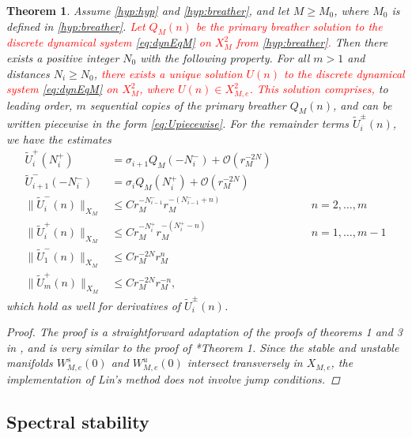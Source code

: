 \documentclass[12pt,reqno]{amsart}
\newtheorem{theorem}{Theorem}
\theoremstyle{definition}
\newcommand{\revised}[1]{ \textcolor{red}{#1} }
\begin{document}
\begin{theorem}\label{th:multi-breathers}
Assume \cref{hyp:hyp} and \cref{hyp:breather}, and let $M \geq M_0$, where $M_0$ is defined in \cref{hyp:breather}. 
\revised{
Let $Q_M(n)$ be the primary breather solution to the discrete dynamical system \cref{eq:dynEqM} on $X_M^2$ from \cref{hyp:breather}.
}
Then there exists a positive integer $N_0$ with the following property. For all $m > 1$ and distances $N_i \geq N_0$, 
\revised{
there exists a unique solution $U(n)$ to the discrete dynamical system \cref{eq:dynEqM} on $X_M^2$, where $U(n) \in X_{M,e}^2$. This solution comprises, 
}
to leading order, $m$ sequential copies of the primary breather $Q_M(n)$, and can be written piecewise in the form \cref{eq:Upiecewise}. For the remainder terms $\tilde{U}_i^\pm(n)$, we have the estimates
\begin{equation}\label{eq:Uestimates}
\begin{aligned}
\tilde{U}_i^+(N_i^+) &= \sigma_{i+1} Q_M(-N_i^-) + \mathcal{O}(r_M^{-2N}) \\
\tilde{U}_{i+1}^-(-N_i^-) &= \sigma_{i} Q_M(N_i^+) + \mathcal{O}(r_M^{-2N}) \\ 
\| \tilde{U}_i^-(n)\|_{X_M} &\leq C r_M^{-N_{i-1}^-} r_M^{-(N_{i-1}^- + n)} && \qquad n = 2, \dots, m\\
\|\tilde{U}_i^+(n) \|_{X_M} &\leq C r_M^{-N_i^+} r_M^{-(N_i^+ - n)} && \qquad n = 1, \dots, m-1 \\
\| \tilde{U}_1^-(n)\|_{X_M} &\leq C r_M^{-2N} r_M^{n} \\
\|\tilde{U}_m^+(n) \|_{X_M} &\leq C r_M^{-2N} r_M^{-n},
\end{aligned}
\end{equation}
which hold as well for derivatives of $\tilde{U}_i^\pm(n)$.
\begin{proof}
The proof is a straightforward adaptation of the proofs of theorems 1 and 3 in \cite{Parker2020}, and is very similar to the proof of \cite{Parker2021}*{Theorem 1}. Since the stable and unstable manifolds $W_{M,e}^s(0)$ and $W_{M,e}^u(0)$ intersect transversely in $X_{M,e}$, the implementation of Lin's method does not involve jump conditions.
\end{proof}
\end{theorem}

\subsection{Spectral stability}
\end{document}
